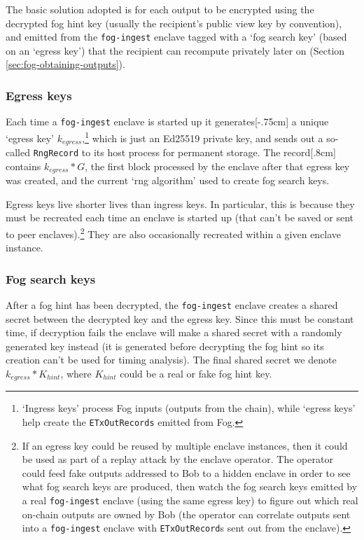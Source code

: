 The basic solution adopted is for each output to be encrypted using the decrypted fog hint key (usually the recipient's public view key by convention), and emitted from the {\tt fog-ingest} enclave tagged with a `fog search key' (based on an `egress key') that the recipient can recompute privately later on (Section \ref{sec:fog-obtaining-outputs}).

\subsubsection{Egress keys}

Each time a {\tt fog-ingest} enclave is started up it generates[-.75cm] a unique `egress key' $k_{egress}$,\footnote{`Ingress keys' process Fog inputs (outputs from the chain), while `egress keys' help create the {\tt ETxOutRecords} emitted from Fog.} which is just an Ed25519 private key, and sends out a so-called {\tt RngRecord} to its host process for permanent storage. The record[.8cm] contains $k_{egress}*G$, the first block processed by the enclave after that egress key was created, and the current `rng algorithm' used to create fog search keys.

Egress keys live shorter lives than ingress keys. In particular, this is because they must be recreated each time an enclave is started up (that can't be saved or sent to peer enclaves).\footnote{If an egress key could be reused by multiple enclave instances, then it could be used as part of a replay attack by the enclave operator. The operator could feed fake outputs addressed to Bob to a hidden enclave in order to see what fog search keys are produced, then watch the fog search keys emitted by a real {\tt fog-ingest} enclave (using the same egress key) to figure out which real on-chain outputs are owned by Bob (the operator can correlate outputs sent into a {\tt fog-ingest} enclave with {\tt ETxOutRecord}s sent out from the enclave).} They are also occasionally recreated within a given enclave instance.

\subsubsection{Fog search keys}

After a fog hint has been decrypted, the {\tt fog-ingest} enclave creates a shared secret between the decrypted key and the egress key. Since this must be constant time, if decryption fails the enclave will make a shared secret with a randomly generated key instead (it is generated before decrypting the fog hint so its creation can't be used for timing analysis). The final shared secret we denote $k_{egress}*K_{hint}$, where $K_{hint}$ could be a real or fake fog hint key.

